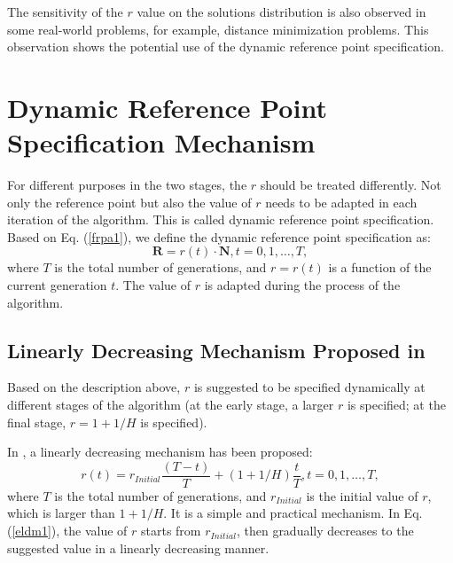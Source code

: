 \documentclass[conference]{IEEEtran}
\begin{document}
The sensitivity of the $r$ value on the solutions distribution is also observed in some real-world problems,
for example, distance minimization problems. 
This observation shows the potential use of the dynamic reference point specification\cite{hisao:dynamic}.

\section{Dynamic Reference Point Specification Mechanism}
For different purposes in the two stages, the $r$ should be treated differently\cite{hisao:dynamic}. 
Not only the reference point but also the value of $r$ 
needs to be adapted in each iteration of the algorithm. 
This is called dynamic reference point specification. 
Based on Eq. (\ref{frpa1}), 
we define the dynamic reference point specification as:
\begin{equation}\label{f2}
  \boldsymbol R = r(t) \cdot \boldsymbol N, 
  t=0,1,\dots,T,
\end{equation}
where $T$ is the total number of generations, and $r=r(t)$ is a function of the current generation $t$.
The value of $r$ is adapted during the process of the algorithm. 


% 
\subsection{Linearly Decreasing Mechanism Proposed in \cite{hisao:dynamic}} 
Based on the description above, $r$ is suggested to be specified dynamically at different stages of
the algorithm (at the early stage, a larger $r$ is specified; at the final stage, $r=1+1/H$ is specified).

In \cite{hisao:dynamic}, a linearly decreasing mechanism has been proposed:
\begin{equation}\label{eldm1}
  r(t)=r_{Initial}\frac{(T-t)}{T}+(1+1/H)\frac{t}{T}, t=0,1,\dots,T,
\end{equation}
where $T$ is the total number of generations, and $r_{Initial}$ is the initial value of $r$,
which is larger than $1+1/H$. 
It is a simple and practical mechanism. In Eq. (\ref{eldm1}), the value of $r$ starts from $r_{Initial}$,
then gradually decreases to the suggested value in a linearly decreasing manner. 
\end{document}
